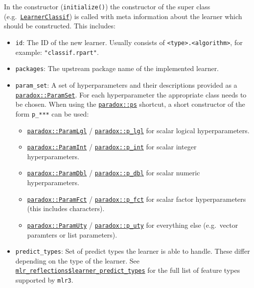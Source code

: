\documentclass[
]{scrbook}
\providecommand{\tightlist}{%
  \setlength{\itemsep}{0pt}\setlength{\parskip}{0pt}}
\begin{document}
In the constructor (\texttt{initialize()}) the constructor of the super class (e.g.~\href{https://mlr3.mlr-org.com/reference/LearnerClassif.html}{\texttt{LearnerClassif}}) is called with meta information about the learner which should be constructed.
This includes:

\begin{itemize}
\tightlist
\item
  \texttt{id}: The ID of the new learner. Usually consists of \texttt{\textless{}type\textgreater{}.\textless{}algorithm\textgreater{}}, for example: \texttt{"classif.rpart"}.
\item
  \texttt{packages}: The upstream package name of the implemented learner.
\item
  \texttt{param\_set}: A set of hyperparameters and their descriptions provided as a \href{https://paradox.mlr-org.com/reference/ParamSet.html}{\texttt{paradox::ParamSet}}.
  For each hyperparameter the appropriate class needs to be chosen. When using the \href{https://paradox.mlr-org.com/reference/ps.html}{\texttt{paradox::ps}} shortcut, a short constructor of the form \texttt{p\_***} can be used:

  \begin{itemize}
  \tightlist
  \item
    \href{https://paradox.mlr-org.com/reference/ParamLgl.html}{\texttt{paradox::ParamLgl}} / \href{https://paradox.mlr-org.com/reference/Domain.html}{\texttt{paradox::p\_lgl}} for scalar logical hyperparameters.
  \item
    \href{https://paradox.mlr-org.com/reference/ParamInt.html}{\texttt{paradox::ParamInt}} / \href{https://paradox.mlr-org.com/reference/Domain.html}{\texttt{paradox::p\_int}} for scalar integer hyperparameters.
  \item
    \href{https://paradox.mlr-org.com/reference/ParamDbl.html}{\texttt{paradox::ParamDbl}} / \href{https://paradox.mlr-org.com/reference/Domain.html}{\texttt{paradox::p\_dbl}} for scalar numeric hyperparameters.
  \item
    \href{https://paradox.mlr-org.com/reference/ParamFct.html}{\texttt{paradox::ParamFct}} / \href{https://paradox.mlr-org.com/reference/Domain.html}{\texttt{paradox::p\_fct}} for scalar factor hyperparameters (this includes characters).
  \item
    \href{https://paradox.mlr-org.com/reference/ParamUty.html}{\texttt{paradox::ParamUty}} / \href{https://paradox.mlr-org.com/reference/Domain.html}{\texttt{paradox::p\_uty}} for everything else (e.g.~vector paramters or list parameters).
  \end{itemize}
\item
  \texttt{predict\_types}: Set of predict types the learner is able to handle.
  These differ depending on the type of the learner. See \href{https://mlr3.mlr-org.com/reference/mlr_reflections.html}{\texttt{mlr\_reflections\$learner\_predict\_types}} for the full list of feature types supported by \texttt{mlr3}.


\end{itemize}
\end{document}
